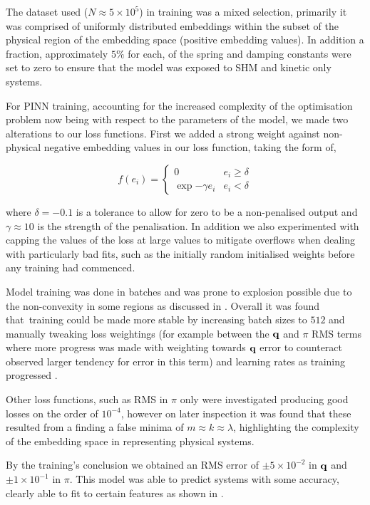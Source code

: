 The dataset used ($N \approx 5 \times 10^5$) in training was a mixed selection, primarily it was comprised of uniformly distributed embeddings within the subset of the physical region of the embedding space (positive embedding values). In addition a fraction, approximately $5 \%$ for each, of the spring and damping constants were set to zero to ensure that the model was exposed to SHM and kinetic only systems.

For PINN training, accounting for the increased complexity of the optimisation problem now being with respect to the parameters of the model, we made two alterations to our loss functions. First we added a strong weight against non-physical negative embedding values in our loss function, taking the form of,

\begin{equation}
  f(e_i) = \begin{cases}
  	0 & e_i \ge \delta \\
  	\exp{-\gamma e_i} & e_i < \delta 
  \end{cases}
\end{equation}

where $\delta = −0.1$ is a tolerance to allow for zero to be a non-penalised output and $\gamma \approx 10$ is the strength of the penalisation. In addition we also experimented with capping the values of the loss at large values to mitigate overflows when dealing with particularly bad fits, such as the initially random initialised weights before any training had commenced.

Model training was done in batches and was prone to explosion possible due to the non-convexity in some regions as discussed in . Overall it was found that training could be made more stable by increasing batch sizes to $512$ and manually tweaking loss weightings (for example between the $\vb q$ and $\pi$ RMS terms where more progress was made with weighting towards $\vb{q}$ error to counteract observed larger tendency for error in this term) and learning rates as training progressed . 

Other loss functions, such as RMS in $\pi$ only were investigated producing good losses on the order of $10^{-4}$, however on later inspection it was found that these resulted from a finding a false minima of $m \approx k \approx \lambda$, highlighting the complexity of the embedding space in representing physical systems.

By the training's conclusion we obtained an RMS error of $\pm 5 \times 10^{-2}$ in $\vb{q}$ and $\pm 1 \times 10 ^{-1}$ in $\pi$. This model was able to predict systems with some accuracy, clearly able to fit to certain features as shown in .

